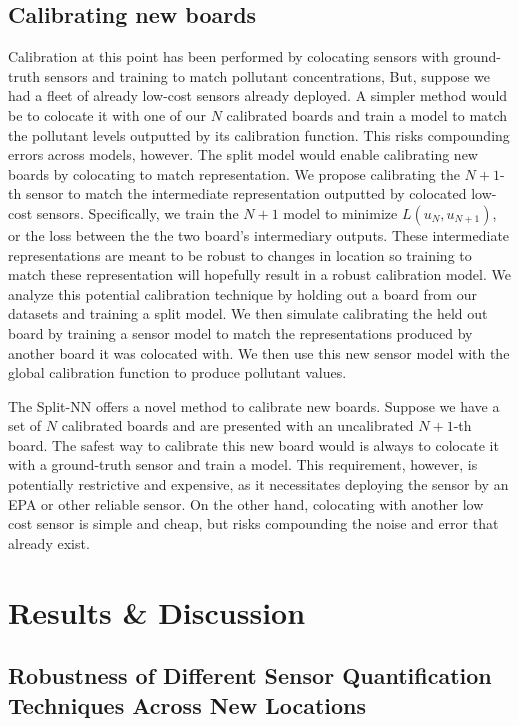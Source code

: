 \documentclass[journal abbreviation, manuscript]{copernicus}
\begin{document}
\subsection{Calibrating new boards}
Calibration at this point has been performed by colocating sensors with ground-truth sensors and training to match pollutant concentrations,
But, suppose we had a fleet of already low-cost sensors already deployed. 
A simpler method would be to colocate it with one of our $N$ calibrated boards and train a model to match the pollutant levels outputted by its calibration function. This risks compounding errors across models, however. 
The split model would enable calibrating new boards by colocating to match representation.
We propose calibrating the $N+1$-th sensor to match the intermediate representation outputted by colocated low-cost sensors. Specifically,
we train the $N + 1$ model to minimize $L(u_N, u_{N + 1})$, or
the loss between the the two board's intermediary outputs.
These intermediate representations are meant to be robust to changes in location so training to match these representation will hopefully result in a robust calibration model. We analyze this potential calibration technique by holding out a board from our datasets and training a split model. We then simulate calibrating the held out board by training a sensor model to match the representations produced by another board it was colocated with. We then use this new sensor model with the global calibration function to produce pollutant values. 

The Split-NN offers a novel method to calibrate new boards.
Suppose we have a set of $N$ calibrated boards and are presented with an uncalibrated $N + 1$-th board. The safest way to calibrate this new board would is always to colocate it with a ground-truth sensor and train a model. 
This requirement, however, is potentially restrictive and expensive, as it
necessitates deploying the sensor by an EPA or other reliable sensor.
On the other hand, colocating with another low cost sensor is simple
and cheap, but risks
compounding the noise and error that already exist.

\section{Results \& Discussion}

\subsection{Robustness of Different Sensor Quantification Techniques Across New Locations}
\end{document}
